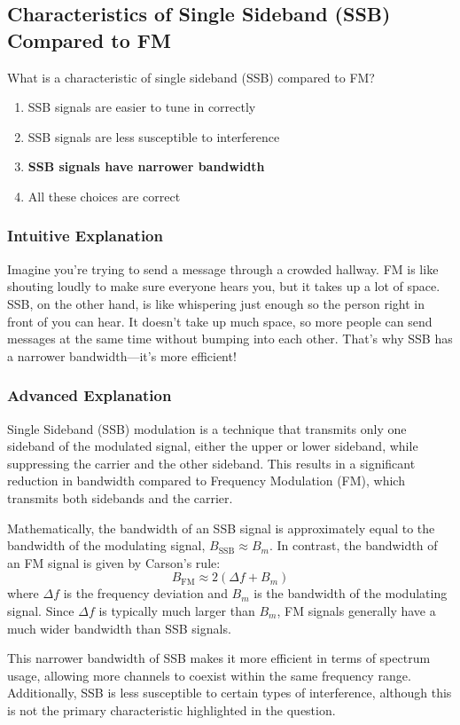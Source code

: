 \subsection{Characteristics of Single Sideband (SSB) Compared to FM}
\label{T8A07}

\begin{tcolorbox}[colback=gray!10!white,colframe=black!75!black,title=T8A07]
What is a characteristic of single sideband (SSB) compared to FM?
\begin{enumerate}[label=\Alph*)]
    \item SSB signals are easier to tune in correctly
    \item SSB signals are less susceptible to interference
    \item \textbf{SSB signals have narrower bandwidth}
    \item All these choices are correct
\end{enumerate}
\end{tcolorbox}

\subsubsection{Intuitive Explanation}
Imagine you're trying to send a message through a crowded hallway. FM is like shouting loudly to make sure everyone hears you, but it takes up a lot of space. SSB, on the other hand, is like whispering just enough so the person right in front of you can hear. It doesn't take up much space, so more people can send messages at the same time without bumping into each other. That's why SSB has a narrower bandwidth—it's more efficient!

\subsubsection{Advanced Explanation}
Single Sideband (SSB) modulation is a technique that transmits only one sideband of the modulated signal, either the upper or lower sideband, while suppressing the carrier and the other sideband. This results in a significant reduction in bandwidth compared to Frequency Modulation (FM), which transmits both sidebands and the carrier. 

Mathematically, the bandwidth of an SSB signal is approximately equal to the bandwidth of the modulating signal, \( B_{\text{SSB}} \approx B_m \). In contrast, the bandwidth of an FM signal is given by Carson's rule:
\[ B_{\text{FM}} \approx 2(\Delta f + B_m) \]
where \( \Delta f \) is the frequency deviation and \( B_m \) is the bandwidth of the modulating signal. Since \( \Delta f \) is typically much larger than \( B_m \), FM signals generally have a much wider bandwidth than SSB signals.

This narrower bandwidth of SSB makes it more efficient in terms of spectrum usage, allowing more channels to coexist within the same frequency range. Additionally, SSB is less susceptible to certain types of interference, although this is not the primary characteristic highlighted in the question.

